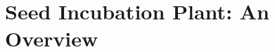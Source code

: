 \documentclass[../main]{subfiles}
\begin{document}
\chapter{Seed Incubation Plant: An Overview} \label{chp:ovrview}












\end{document}

